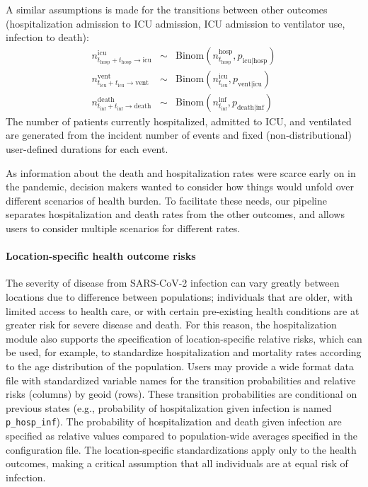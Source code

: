 {A similar assumptions is made for the transitions between other outcomes (hospitalization admission to ICU admission, ICU admission to ventilator use, infection to death):
\begin{eqnarray}
n_{t_\text{hosp} + t_\text{hosp}\to \text{icu}}^\text{icu} &\sim & \text{Binom}\left(n_{t_\text{hosp}}^\text{hosp} , p_{\text{icu}\mid \text{hosp}} \right)\\
n_{t_\text{icu} + t_\text{icu} \to \text{vent}}^\text{vent} &\sim & \text{Binom}\left(n_{t_\text{icu}}^\text{icu}, p_{\text{vent} \mid \text{icu}} \right) \\
n_{t_\text{inf} + t_\text{inf} \to \text{death}}^\text{death} &\sim & \text{Binom}\left(n_{t_\text{inf}}^\text{inf}, p_{\text{death}\mid \text{inf}}  \right)
\end{eqnarray}
The number of patients currently hospitalized, admitted to ICU, and ventilated are generated from the incident number of events and fixed (non-distributional) user-defined durations for each event.

As information about the death and hospitalization rates were scarce early on in the pandemic, decision makers wanted to consider how things would unfold over different scenarios of health burden. To facilitate these needs, our pipeline separates hospitalization and death rates from the other outcomes, and allows users to consider multiple scenarios for different rates.

\paragraph{Location-specific health outcome risks}
The severity of disease from SARS-CoV-2 infection can vary greatly between locations due to difference between populations; individuals that are older, with limited access to health care, or with certain pre-existing health conditions are at greater risk for severe disease and death. For this reason, the hospitalization module also supports the specification of location-specific relative risks, which can be used, for example, to standardize hospitalization and mortality rates according to the age distribution of the population. Users may provide a wide format data file with standardized variable names for the transition probabilities and relative risks (columns) by geoid (rows). These transition probabilities are conditional on previous states (e.g., probability of hospitalization given infection is named \verb|p_hosp_inf|). The probability of hospitalization and death given infection are specified as relative values compared to population-wide averages specified in the configuration file. The location-specific standardizations apply only to the health outcomes, making a critical assumption that all individuals are at equal risk of infection.

}
